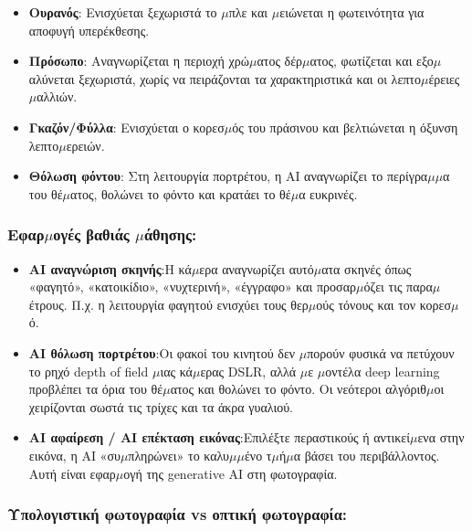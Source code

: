 \begin{itemize}
  \item \textbf{Ουρανός}: Ενισχύεται ξεχωριστά το $\mu$πλε και $\mu$ειώνεται η φωτεινότητα για αποφυγή υπερέκθεσης.
  \item \textbf{Πρόσωπο}: Αναγνωρίζεται η περιοχή χρώ$\mu$ατος δέρ$\mu$ατος, φωτίζεται και εξο$\mu$αλύνεται ξεχωριστά, χωρίς να πειράζονται τα χαρακτηριστικά και οι λεπτο$\mu$έρειες $\mu$αλλιών.
  \item \textbf{Γκαζόν/Φύλλα}: Ενισχύεται ο κορεσ$\mu$ός του πράσινου και βελτιώνεται η όξυνση λεπτο$\mu$ερειών.
  \item \textbf{Θόλωση φόντου}: Στη λειτουργία πορτρέτου, η AI αναγνωρίζει το περίγρα$\mu$$\mu$α του θέ$\mu$ατος, θολώνει το φόντο και κρατάει το θέ$\mu$α ευκρινές.
\end{itemize}

\subsubsection*{Εφαρ$\mu$ογές βαθιάς $\mu$άθησης:}

\begin{itemize}
  \item \textbf{AI αναγνώριση σκηνής}:Η κά$\mu$ερα αναγνωρίζει αυτό$\mu$ατα σκηνές όπως «φαγητό», «κατοικίδιο», «νυχτερινή», «έγγραφο» και προσαρ$\mu$όζει τις παρα$\mu$έτρους. Π.χ. η λειτουργία φαγητού ενισχύει τους θερ$\mu$ούς τόνους και τον κορεσ$\mu$ό.
  \item \textbf{AI θόλωση πορτρέτου}:Οι φακοί του κινητού δεν $\mu$πορούν φυσικά να πετύχουν το ρηχό depth of field $\mu$ιας κά$\mu$ερας DSLR, αλλά $\mu$ε $\mu$οντέλα deep learning προβλέπει τα όρια του θέ$\mu$ατος και θολώνει το φόντο. Οι νεότεροι αλγόριθ$\mu$οι χειρίζονται σωστά τις τρίχες και τα άκρα γυαλιού.
  \item \textbf{AI αφαίρεση / AI επέκταση εικόνας}:Επιλέξτε περαστικούς ή αντικεί$\mu$ενα στην εικόνα, η AI «συ$\mu$πληρώνει» το καλυ$\mu$$\mu$ένο τ$\mu$ή$\mu$α βάσει του περιβάλλοντος. Αυτή είναι εφαρ$\mu$ογή της generative AI στη φωτογραφία.
\end{itemize}

\subsubsection*{Υπολογιστική φωτογραφία vs οπτική φωτογραφία:}

